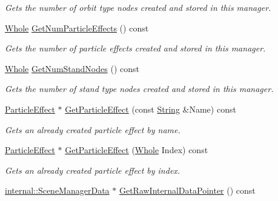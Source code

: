 \begin{DoxyCompactItemize}
\begin{DoxyCompactList}\small\item\em Gets the number of orbit type nodes created and stored in this manager. \item\end{DoxyCompactList}\item 
\hyperlink{namespacephys_a460f6bc24c8dd347b05e0366ae34f34a}{Whole} \hyperlink{classphys_1_1SceneManager_aad3e20c92eef52372671450704a2ac51}{GetNumParticleEffects} () const 
\begin{DoxyCompactList}\small\item\em Gets the number of particle effects created and stored in this manager. \item\end{DoxyCompactList}\item 
\hyperlink{namespacephys_a460f6bc24c8dd347b05e0366ae34f34a}{Whole} \hyperlink{classphys_1_1SceneManager_ab80f76686a3cbf2c2ec49ae7eadf8c95}{GetNumStandNodes} () const 
\begin{DoxyCompactList}\small\item\em Gets the number of stand type nodes created and stored in this manager. \item\end{DoxyCompactList}\item 
\hyperlink{classphys_1_1ParticleEffect}{ParticleEffect} $\ast$ \hyperlink{classphys_1_1SceneManager_af1f8d6b77b1088dea72685719ff6936f}{GetParticleEffect} (const \hyperlink{namespacephys_aa03900411993de7fbfec4789bc1d392e}{String} \&Name) const 
\begin{DoxyCompactList}\small\item\em Gets an already created particle effect by name. \item\end{DoxyCompactList}\item 
\hyperlink{classphys_1_1ParticleEffect}{ParticleEffect} $\ast$ \hyperlink{classphys_1_1SceneManager_acfe014153bbda04b181959774536aec5}{GetParticleEffect} (\hyperlink{namespacephys_a460f6bc24c8dd347b05e0366ae34f34a}{Whole} Index) const 
\begin{DoxyCompactList}\small\item\em Gets an already created particle effect by index. \item\end{DoxyCompactList}\item 
\hyperlink{classphys_1_1internal_1_1SceneManagerData}{internal::SceneManagerData} $\ast$ \hyperlink{classphys_1_1SceneManager_a8f9073372374320723b7381f326f8753}{GetRawInternalDataPointer} () const 

\end{DoxyCompactItemize}
